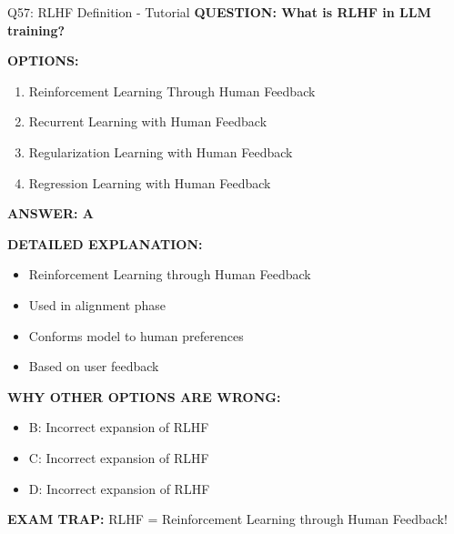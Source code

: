 \documentclass[8pt]{beamer}
\begin{document}
	\begin{frame}{Q57: RLHF Definition - Tutorial}
		\fontsize{6.5}{7.5}\selectfont
		\textbf{QUESTION: What is RLHF in LLM training?}
		
		\vspace{0.1cm}
		\textbf{OPTIONS:}
		\begin{enumerate}
			\item Reinforcement Learning Through Human Feedback
			\item Recurrent Learning with Human Feedback
			\item Regularization Learning with Human Feedback
			\item Regression Learning with Human Feedback
		\end{enumerate}
		
		\vspace{0.1cm}
		\textcolor{myblue}{\textbf{ANSWER: A}}
		
		\vspace{0.1cm}
		\textbf{DETAILED EXPLANATION:}
		\begin{itemize}
			\item Reinforcement Learning through Human Feedback
			\item Used in alignment phase
			\item Conforms model to human preferences
			\item Based on user feedback
		\end{itemize}
		
		\vspace{0.1cm}
		\textcolor{myred}{\textbf{WHY OTHER OPTIONS ARE WRONG:}}
		\begin{itemize}
			\item \textcolor{myred}{B:} Incorrect expansion of RLHF
			\item \textcolor{myred}{C:} Incorrect expansion of RLHF
			\item \textcolor{myred}{D:} Incorrect expansion of RLHF
		\end{itemize}
		
		\textcolor{myred}{\textbf{EXAM TRAP:}} RLHF = \textcolor{myblue}{Reinforcement Learning through Human Feedback}!
	\end{frame}
	
\end{document}
